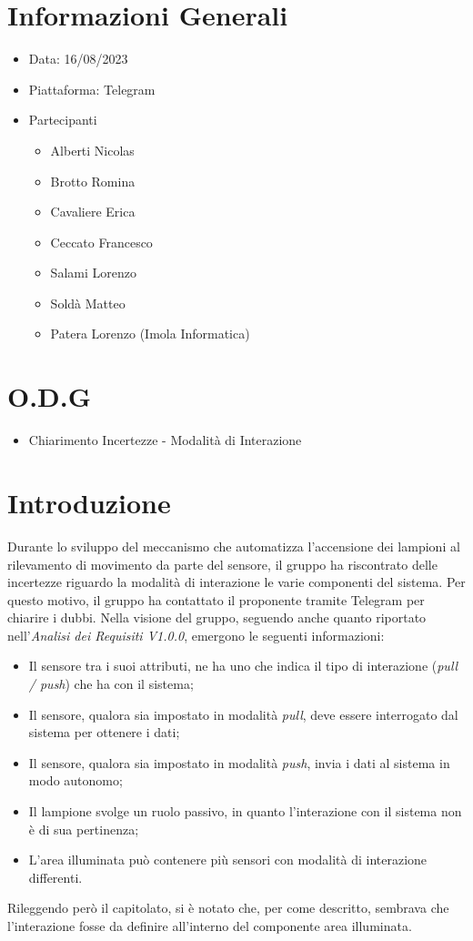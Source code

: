\documentclass[a4paper, 12pt]{article}
\begin{document}
\makefrontpage
\section*{Informazioni Generali}
\begin{itemize}
    \item Data: 16/08/2023
    \item Piattaforma: Telegram
    \item Partecipanti
    \begin{itemize}
        \item Alberti Nicolas
        \item Brotto Romina
        \item Cavaliere Erica
        \item Ceccato Francesco
        \item Salami Lorenzo
        \item Soldà Matteo
        \item Patera Lorenzo (Imola Informatica)
    \end{itemize}
\end{itemize}
\section*{O.D.G}
\begin{itemize}
    \item Chiarimento Incertezze - Modalità di Interazione
\end{itemize}

\section*{Introduzione}
Durante lo sviluppo del meccanismo che automatizza l'accensione dei lampioni al rilevamento di movimento da parte del sensore, il gruppo ha riscontrato delle incertezze riguardo la modalità di interazione le varie componenti del sistema. Per questo motivo, il gruppo ha contattato il proponente tramite Telegram per chiarire i dubbi.
Nella visione del gruppo, seguendo anche quanto riportato nell'\textit{Analisi dei Requisiti V1.0.0}, emergono le seguenti informazioni:
\begin{itemize}
    \item Il sensore tra i suoi attributi, ne ha uno che indica il tipo di interazione (\textit{pull / push}) che ha con il sistema;
    \item Il sensore, qualora sia impostato in modalità \textit{pull}, deve essere interrogato dal sistema per ottenere i dati;
    \item Il sensore, qualora sia impostato in modalità \textit{push}, invia i dati al sistema in modo autonomo;
    \item Il lampione svolge un ruolo passivo, in quanto l'interazione con il sistema non è di sua pertinenza;
    \item L'area illuminata può contenere più sensori con modalità di interazione differenti.
\end{itemize}
Rileggendo però il capitolato, si è notato che, per come descritto, sembrava che l'interazione fosse da definire all'interno del componente area illuminata.
\end{document}

